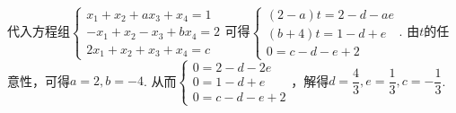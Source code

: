 \begin{enumerate}
          代入方程组$\begin{cases}
                  x_1+x_2+ax_3+x_4=1  \\
                  -x_1+x_2-x_3+bx_4=2 \\
                  2x_1+x_2+x_3+x_4=c
              \end{cases}$可得$\begin{cases}
                  (2-a)t=2-d-ae \\
                  (b+4)t=1-d+e  \\
                  0=c-d-e+2
              \end{cases}$. 由$t$的任意性，可得$a=2,b=-4$. 从而$\begin{cases}
                  0=2-d-2e \\
                  0=1-d+e  \\
                  0=c-d-e+2
              \end{cases}$，解得$d=\dfrac{4}{3},e=\dfrac{1}{3},c=-\dfrac{1}{3}$.


\end{enumerate}
